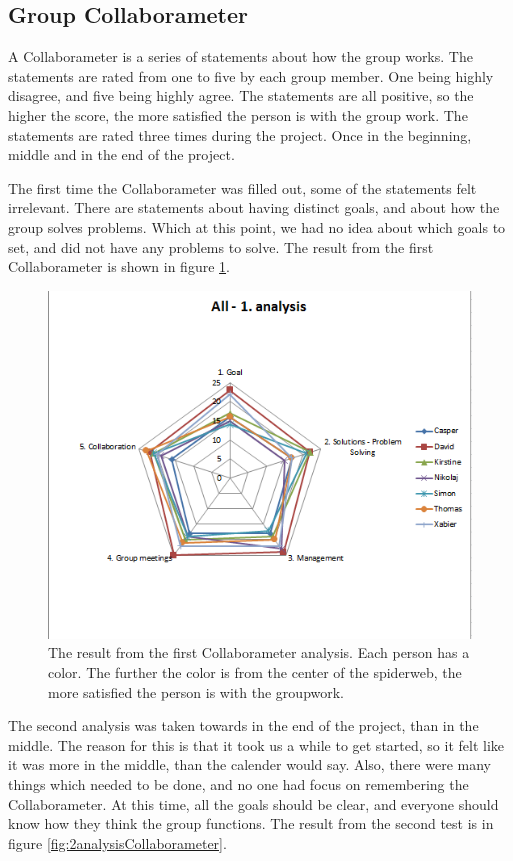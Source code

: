 \subsection{Group Collaborameter}
A Collaborameter is a series of statements about how the group works. The statements are rated from one to five by each group member. One being highly disagree, and five being highly agree. The statements are all positive, so the higher the score, the more satisfied the person is with the group work. The statements are rated three times during the project. Once in the beginning, middle and in the end of the project. 

The first time the Collaborameter was filled out, some of the statements felt irrelevant. There are statements about having distinct goals, and about how the group solves problems. Which at this point, we had no idea about which goals to set, and did not have any problems to solve. The result from the first Collaborameter is shown in figure \ref{fig:1analysisCollaborameter}.

\begin{figure}[h]
\centering
\includegraphics[width=0.7\linewidth]{graphics/1analysisCollaborameter}
\caption[Result from first Collaborameter analysis]{The result from the first Collaborameter analysis. Each person has a color. The further the color is from the center of the spiderweb, the more satisfied the person is with the groupwork.}
\label{fig:1analysisCollaborameter}
\end{figure}


The second analysis was taken towards in the end of the project, than in the middle. The reason for this is that it took us a while to get started, so it felt like it was more in the middle, than the calender would say. Also, there were many things which needed to be done, and no one had focus on remembering the Collaborameter. At this time, all the goals should be clear, and everyone should know how they think the group functions. The result from the second test is in figure \ref{fig:2analysisCollaborameter}.

